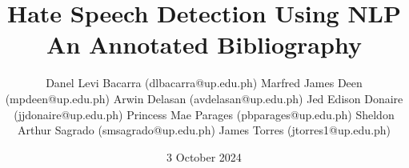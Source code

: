 \documentclass[11pt]{article}
\title{Hate Speech Detection Using NLP\\\medskip An Annotated Bibliography}
\author{
	Danel Levi Bacarra (dlbacarra@up.edu.ph)
	Marfred James Deen (mpdeen@up.edu.ph)
	Arwin Delasan (avdelasan@up.edu.ph)
	Jed Edison Donaire (jjdonaire@up.edu.ph)
	Princess Mae Parages (pbparages@up.edu.ph)
	Sheldon Arthur Sagrado (smsagrado@up.edu.ph)
	James Torres (jtorres1@up.edu.ph)
}
\date{3 October 2024}
\begin{document}
\maketitle
\nocite{*} %


\end{document}
